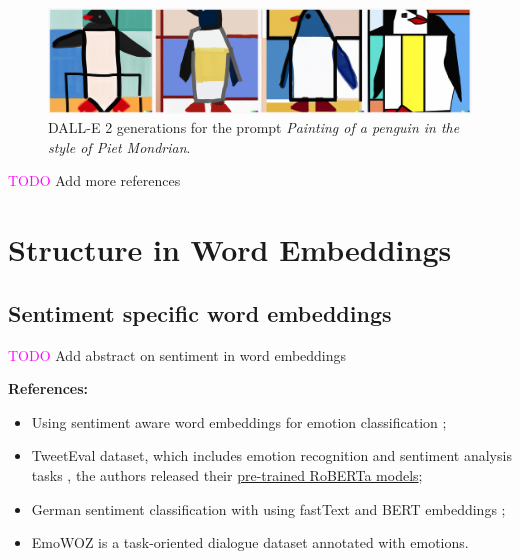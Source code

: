 \documentclass[11pt, a4paper]{amsart}
\begin{document}
\begin{figure}
	\centering
	\includegraphics[width=\linewidth]{pictures/text_to_image/DALLE2 Painting of a penguin in the style of Piet Mondrian.png}
	\caption{DALL-E 2 generations for the prompt \emph{Painting of a penguin in the style of Piet Mondrian}.}
	\label{fig:DALLE2_penguin_piet_mondrian}
\end{figure}



\textcolor{magenta}{TODO} Add more references

\section{Structure in Word Embeddings}

\subsection{Sentiment specific word embeddings}

\textcolor{magenta}{TODO} Add abstract on sentiment in word embeddings

\noindent \textbf{References:}
\begin{itemize}
	\item Using sentiment aware word embeddings for emotion classification \cite{sentiment-aware-word-embedding-emotion-2019};
	\item TweetEval dataset, which includes emotion recognition and sentiment analysis tasks \cite{barbieri-etal-2020-tweeteval}, the authors released their \href{https://huggingface.co/cardiffnlp/twitter-roberta-base-sentiment}{pre-trained RoBERTa models};
	\item German sentiment classification with using fastText and BERT embeddings \cite{guhr-etal-2020-training};
	\item EmoWOZ \cite{DBLP:journals/corr/abs-2109-04919} is a task-oriented dialogue dataset annotated with emotions.
\end{itemize}
\end{document}
